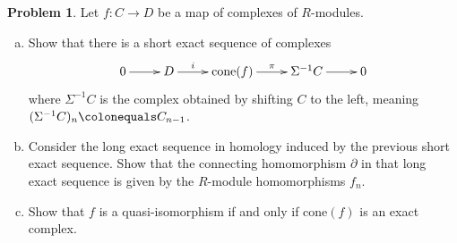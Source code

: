 \documentclass[11pt]{article}
\theoremstyle{definition}
\newtheorem{problem}{Problem}
\begin{document}
\begin{problem} 
Let $f\!: C \longrightarrow D$ be a map of complexes of $R$-modules.
	\begin{enumerate}[a)]
		\item Show that there is a short exact sequence of complexes
		$$\xymatrix{0 \ar[r] & D \ar[r]^-i & \textrm{cone}(f) \ar[r]^-{\pi} & \Sigma^{-1} C \ar[r] & 0}$$
		where $\Sigma^{-1} C$ is the complex obtained by shifting $C$ to the left, meaning $(\Sigma^{-1} C)_n \colonequals C_{n-1}$.
		\item Consider the long exact sequence in homology induced by the previous short exact sequence. Show that the connecting homomorphism $\partial$ in that long exact sequence is given by the $R$-module homomorphisms $f_n$.
		\item Show that $f$ is a quasi-isomorphism if and only if $\textrm{cone}(f)$ is an exact complex.
	\end{enumerate}
\end{problem}
\end{document}
